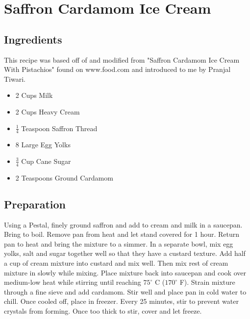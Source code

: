 \thispagestyle{fancy}
\section{Saffron Cardamom Ice Cream}
\AddToShipoutPicture*{\SaffronIceCream}

\subsection*{Ingredients}
This recipe was based off of and modified from "Saffron Cardamom Ice Cream With Pistachios" found on www.food.com and introduced to me by Pranjal Tiwari.
\begin{multicols}{3}
	\begin{itemize}
		\item 2 Cups Milk
		\item 2 Cups Heavy Cream
		\item $\frac{1}{4}$ Teaspoon Saffron Thread
		\item 8 Large Egg Yolks
		\item $\frac{3}{4}$ Cup Cane Sugar
		\item 2 Teaspoons Ground Cardamom
	\end{itemize}
\end{multicols}

\subsection*{Preparation}

Using a Pestal, finely ground saffron and add to cream and milk in a saucepan. Bring to boil. Remove pan from heat and let stand covered for 1 hour. Return pan to heat and bring the mixture to a simmer. In a separate bowl, mix egg yolks, salt and sugar together well so that they have a custard texture. Add half a cup of cream mixture into custard and mix well. Then mix rest of cream mixture in slowly while mixing. Place mixture back into saucepan and cook over medium-low heat while stirring until reaching $75^\circ$ C ($170^\circ$ F). Strain mixture through a fine sieve and add cardamom. Stir well and place pan in cold water to chill. Once cooled off, place in freezer. Every 25 minutes, stir to prevent water crystals from forming. Once too thick to stir, cover and let freeze.